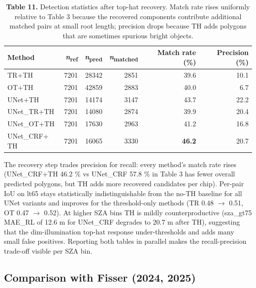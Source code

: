 \documentclass[review,jog]{igs}
\begin{document}
\begin{table}[h]
\caption{\textbf{Table 11.} Detection statistics after top-hat recovery. Match rate rises uniformly relative to Table 3 because the recovered components contribute additional matched pairs at small root length; precision drops because TH adds polygons that are sometimes spurious bright objects.}
\centering
\begin{tabular}{lrrrrr}
\toprule
Method & \textit{n}\textsubscript{ref} & \textit{n}\textsubscript{pred} & \textit{n}\textsubscript{matched} & Match rate (\%) & Precision (\%) \\
\midrule
TR$+$TH        & 7201 & 28342 & 2851 & 39.6 & 10.1 \\
OT$+$TH        & 7201 & 42859 & 2883 & 40.0 &  6.7 \\
UNet$+$TH      & 7201 & 14174 & 3147 & 43.7 & 22.2 \\
UNet\_TR$+$TH  & 7201 & 14080 & 2874 & 39.9 & 20.4 \\
UNet\_OT$+$TH  & 7201 & 17630 & 2963 & 41.2 & 16.8 \\
UNet\_CRF$+$TH & 7201 & 16065 & 3330 & \textbf{46.2} & 20.7 \\
\bottomrule
\end{tabular}
\end{table}

The recovery step trades precision for recall: every method's match rate rises (UNet\_CRF$+$TH 46.2 \% vs UNet\_CRF 57.8 \% in Table 3 has fewer overall predicted polygons, but TH adds more recovered candidates per chip). Per-pair IoU on lt65 stays statistically indistinguishable from the no-TH baseline for all UNet variants and improves for the threshold-only methods (TR 0.48 $\rightarrow$ 0.51, OT 0.47 $\rightarrow$ 0.52). At higher SZA bins TH is mildly counterproductive (sza\_gt75 MAE\_RL of 12.6 m for UNet\_CRF degrades to 20.7 m after TH), suggesting that the dim-illumination top-hat response under-thresholds and adds many small false positives. Reporting both tables in parallel makes the recall-precision trade-off visible per SZA bin.

\subsection{Comparison with Fisser (2024, 2025)}
\end{document}
